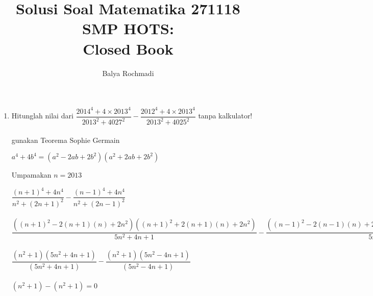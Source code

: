 \documentclass[12pt,a4paper,draft,final,oneside,twoside,openright,openany]{article}
\author{Balya Rochmadi}
\title{Solusi Soal Matematika 271118 SMP HOTS: \\Closed Book}
\begin{document}
	\maketitle
	\begin{enumerate}
		\item Hitunglah nilai dari $\dfrac{2014^4+4\times 2013^4}{2013^2+4027^2}-\dfrac{2012^4+4\times 2013^4}{2013^2+4025^2}$ tanpa kalkulator!\\
		\\
		gunakan 
		Teorema Sophie Germain 
		\begin{center}
			$a^4+4b^4=(a^2-2ab+2b^2)(a^2+2ab+2b^2)$
		\end{center}
		
		
		Umpamakan $n=2013$
		\begin{center}
			$\dfrac{(n+1)^4+4n^4}{n^2+(2n+1)^2}-\dfrac{(n-1)^4+4n^4}{n^2+(2n-1)^2}$ \\
			
			\paragraph{}
			
			$\dfrac{((n+1)^2-2(n+1)(n)+2n^2)((n+1)^2+2(n+1)(n)+2n^2)}{5n^2+4n+1}-\dfrac{((n-1)^2-2(n-1)(n)+2n^2)((n-1)^2+2(n-1)(n)+2n^2)}{5n^2-4n+1}$
			
			\paragraph{}
			$\dfrac{(n^2+1)(5n^2+4n+1)}{(5n^2+4n+1)}-\dfrac{(n^2+1)(5n^2-4n+1)}{(5n^2-4n+1)}$
			
			\paragraph{}
			$(n^2+1)-(n^2+1)=0$
			
		\end{center}
			
		
		
	\end{enumerate}
	
	
	
	
\end{document}
